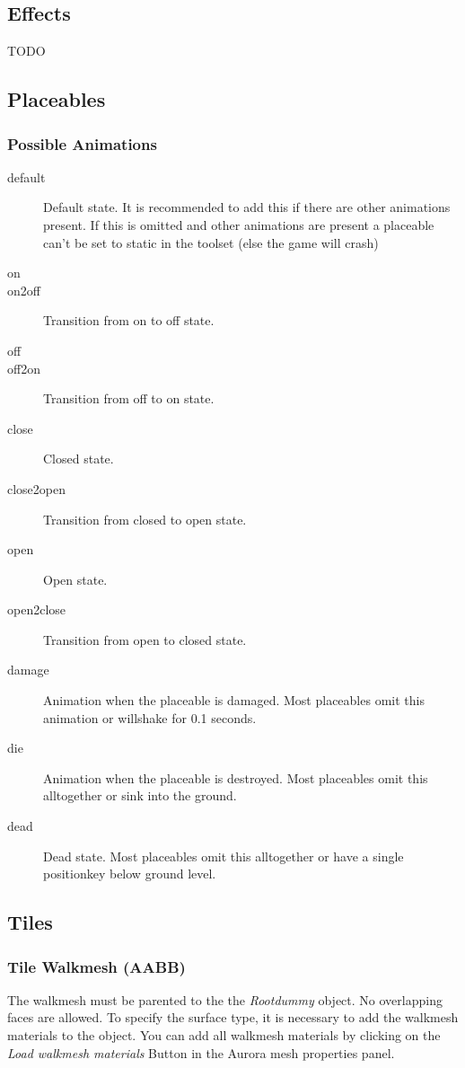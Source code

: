 \subsection{Effects}
TODO


\subsection{Placeables}

\subsubsection*{Possible Animations}
\begin{description}
    \item[default] Default state. It is recommended to add this if there are other animations present. If this is omitted and other animations are present a placeable can't be set to static in the toolset (else the game will crash)
    \item[on]
    \item[on2off] Transition from on to off state.
    \item[off]
    \item[off2on] Transition from off to on state.
    \item[close] Closed state.
    \item[close2open] Transition from closed to open state.
    \item[open] Open state.
    \item[open2close] Transition from open to closed state.
    \item[damage] Animation when the placeable is damaged. Most placeables omit this animation or willshake for 0.1 seconds.
    \item[die] Animation when the placeable is destroyed. Most placeables omit this alltogether or sink into the ground.
    \item[dead] Dead state. Most placeables omit this alltogether or have a single positionkey below ground level.
\end{description}

\subsection{Tiles}

\subsubsection*{Tile Walkmesh (AABB)}
The walkmesh must be parented to the the {\textit{Rootdummy}} object.
No overlapping faces are allowed. To specify the surface type, it is necessary
to add the walkmesh materials to the object. You can add all walkmesh
materials by clicking on the {\textit{Load walkmesh materials}} Button in the
Aurora mesh properties panel. \\ \\

